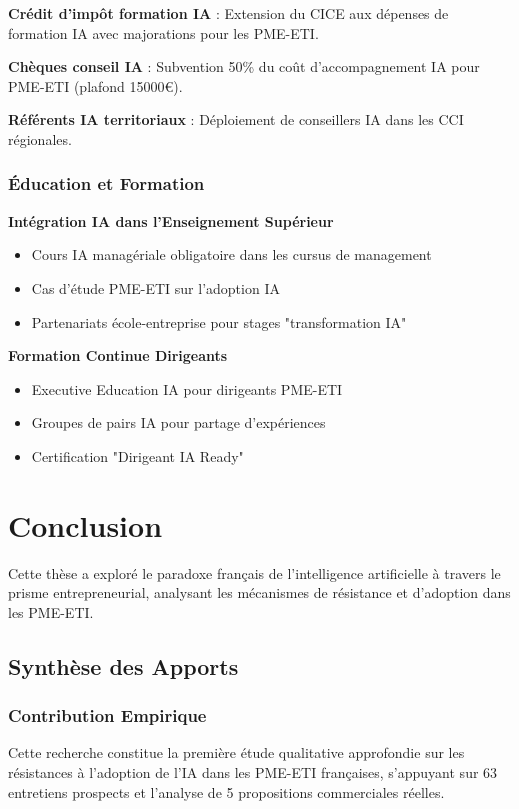 \documentclass[12pt,a4paper]{report}
\begin{document}
\textbf{Crédit d'impôt formation IA} : Extension du CICE aux dépenses de formation IA avec majorations pour les PME-ETI.

\textbf{Chèques conseil IA} : Subvention 50\% du coût d'accompagnement IA pour PME-ETI (plafond 15000€).

\textbf{Référents IA territoriaux} : Déploiement de conseillers IA dans les CCI régionales.

\subsection{Éducation et Formation}

\textbf{Intégration IA dans l'Enseignement Supérieur}
\begin{itemize}
\item Cours IA managériale obligatoire dans les cursus de management
\item Cas d'étude PME-ETI sur l'adoption IA
\item Partenariats école-entreprise pour stages "transformation IA"
\end{itemize}

\textbf{Formation Continue Dirigeants}
\begin{itemize}
\item Executive Education IA pour dirigeants PME-ETI
\item Groupes de pairs IA pour partage d'expériences
\item Certification "Dirigeant IA Ready"
\end{itemize}

\chapter{Conclusion}

Cette thèse a exploré le paradoxe français de l'intelligence artificielle à travers le prisme entrepreneurial, analysant les mécanismes de résistance et d'adoption dans les PME-ETI.

\section{Synthèse des Apports}

\subsection{Contribution Empirique}
Cette recherche constitue la première étude qualitative approfondie sur les résistances à l'adoption de l'IA dans les PME-ETI françaises, s'appuyant sur 63 entretiens prospects et l'analyse de 5 propositions commerciales réelles.
\end{document}
